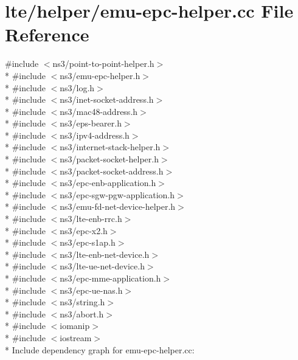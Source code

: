 \hypertarget{emu-epc-helper_8cc}{}\section{lte/helper/emu-\/epc-\/helper.cc File Reference}
\label{emu-epc-helper_8cc}
{\ttfamily \#include $<$ns3/point-\/to-\/point-\/helper.\+h$>$}\\*
{\ttfamily \#include $<$ns3/emu-\/epc-\/helper.\+h$>$}\\*
{\ttfamily \#include $<$ns3/log.\+h$>$}\\*
{\ttfamily \#include $<$ns3/inet-\/socket-\/address.\+h$>$}\\*
{\ttfamily \#include $<$ns3/mac48-\/address.\+h$>$}\\*
{\ttfamily \#include $<$ns3/eps-\/bearer.\+h$>$}\\*
{\ttfamily \#include $<$ns3/ipv4-\/address.\+h$>$}\\*
{\ttfamily \#include $<$ns3/internet-\/stack-\/helper.\+h$>$}\\*
{\ttfamily \#include $<$ns3/packet-\/socket-\/helper.\+h$>$}\\*
{\ttfamily \#include $<$ns3/packet-\/socket-\/address.\+h$>$}\\*
{\ttfamily \#include $<$ns3/epc-\/enb-\/application.\+h$>$}\\*
{\ttfamily \#include $<$ns3/epc-\/sgw-\/pgw-\/application.\+h$>$}\\*
{\ttfamily \#include $<$ns3/emu-\/fd-\/net-\/device-\/helper.\+h$>$}\\*
{\ttfamily \#include $<$ns3/lte-\/enb-\/rrc.\+h$>$}\\*
{\ttfamily \#include $<$ns3/epc-\/x2.\+h$>$}\\*
{\ttfamily \#include $<$ns3/epc-\/s1ap.\+h$>$}\\*
{\ttfamily \#include $<$ns3/lte-\/enb-\/net-\/device.\+h$>$}\\*
{\ttfamily \#include $<$ns3/lte-\/ue-\/net-\/device.\+h$>$}\\*
{\ttfamily \#include $<$ns3/epc-\/mme-\/application.\+h$>$}\\*
{\ttfamily \#include $<$ns3/epc-\/ue-\/nas.\+h$>$}\\*
{\ttfamily \#include $<$ns3/string.\+h$>$}\\*
{\ttfamily \#include $<$ns3/abort.\+h$>$}\\*
{\ttfamily \#include $<$iomanip$>$}\\*
{\ttfamily \#include $<$iostream$>$}\\*
Include dependency graph for emu-\/epc-\/helper.cc\+:
